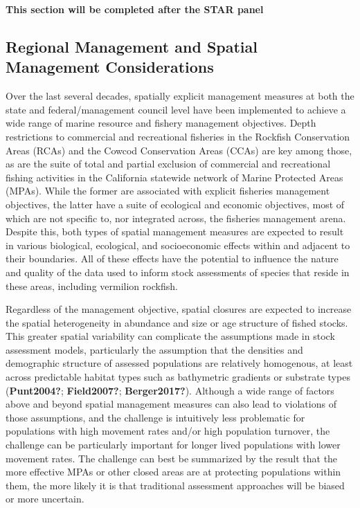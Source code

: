 \documentclass[
  english,
  a4paper,
]{article}
\begin{document}
\textbf{This section will be completed after the STAR panel}

\hypertarget{regional-management-and-spatial-management-considerations}{%
\subsection{Regional Management and Spatial Management Considerations}\label{regional-management-and-spatial-management-considerations}}

Over the last several decades, spatially explicit management measures at both the state and federal/management council level have been implemented to achieve a wide range of marine resource and fishery management objectives. Depth restrictions to commercial and recreational fisheries in the Rockfish Conservation Areas (RCAs) and the Cowcod Conservation Areas (CCAs) are key among those, as are the suite of total and partial exclusion of commercial and recreational fishing activities in the California statewide network of Marine Protected Areas (MPAs). While the former are associated with explicit fisheries management objectives, the latter have a suite of ecological and economic objectives, most of which are not specific to, nor integrated across, the fisheries management arena. Despite this, both types of spatial management measures are expected to result in various biological, ecological, and socioeconomic effects within and adjacent to their boundaries. All of these effects have the potential to influence the nature and quality of the data used to inform stock assessments of species that reside in these areas, including vermilion rockfish.

Regardless of the management objective, spatial closures are expected to increase the spatial heterogeneity in abundance and size or age structure of fished stocks. This greater spatial variability can complicate the assumptions made in stock assessment models, particularly the assumption that the densities and demographic structure of assessed populations are relatively homogenous, at least across predictable habitat types such as bathymetric gradients or substrate types (\textbf{Punt2004?}; \textbf{Field2007?}; \textbf{Berger2017?}). Although a wide range of factors above and beyond spatial management measures can also lead to violations of those assumptions, and the challenge is intuitively less problematic for populations with high movement rates and/or high population turnover, the challenge can be particularly important for longer lived populations with lower movement rates. The challenge can best be summarized by the result that the more effective MPAs or other closed areas are at protecting populations within them, the more likely it is that traditional assessment approaches will be biased or more uncertain.
\end{document}
